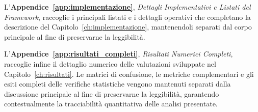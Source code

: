 L'\textbf{Appendice~\ref{app:implementazione}}, \textit{Dettagli Implementativi e Listati del Framework}, raccoglie i principali listati e i dettagli operativi che completano la descrizione del Capitolo~\ref{ch:implementazione}, mantenendoli separati dal corpo principale al fine di preservarne la leggibilità.

L'\textbf{Appendice~\ref{app:risultati_completi}}, \textit{Risultati Numerici Completi}, raccoglie infine il dettaglio numerico delle valutazioni sviluppate nel Capitolo~\ref{ch:risultati}. 
Le matrici di confusione, le metriche complementari e gli esiti completi delle verifiche statistiche vengono mantenuti separati dalla discussione principale al fine di preservarne la leggibilità, garantendo contestualmente la tracciabilità quantitativa delle analisi presentate.
